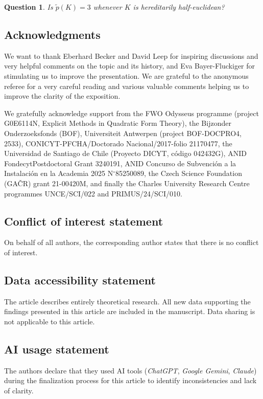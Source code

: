 \documentclass[12pt,leqno]{amsart}
\newcommand{\wt}[1]{\widetilde{{#1}}}
\numberwithin{equation}{section}
\newtheorem{qu}[equation]{Question}
\theoremstyle{definition}
\theoremstyle{plain}
\begin{document}
\begin{qu}\label{Q:final2}
Is $\wt{p}(K)=3$ whenever $K$ is hereditarily half-euclidean?
\end{qu}

\subsection*{Acknowledgments} 
We want to thank Eberhard Becker and David Leep for inspiring discussions and very helpful comments on the topic and its history, and Eva Bayer-Fluckiger for stimulating us to improve the presentation.
We are grateful to the anonymous referee for a very careful reading and various valuable comments helping us to improve the clarity of the exposition.

We gratefully acknowledge support from the {FWO Odysseus programme} (pro\-ject G0E6114N, {Explicit Methods in Quadratic Form Theory}), 
the Bijzonder Onderzoeksfonds (BOF), Universiteit Antwerpen
(project BOF-DOCPRO4, 2533), CONICYT-PFCHA/Doctorado Nacional/2017-folio 21170477, the Universidad de Santiago de Chile (Proyecto DICYT,
c\'odigo 042432G), ANID Fondecyt\linebreak Postdoctoral Grant 3240191, ANID Concurso de Subvenci\'on a la Instalaci\'on en la Academia 2025 N$^\circ$85250089, the {Czech Science Foundation} (GA\v CR) grant 21-00420M, and finally the {Charles University Research Centre programmes} \linebreak UNCE/SCI/022 and PRIMUS/24/SCI/010.

\subsection*{Conflict of interest statement}
On behalf of all authors, the corresponding author states that there is no conflict of interest.

\subsection*{Data accessibility statement}
The  article describes entirely theoretical research.
All new data supporting the findings presented in this article are included in the manuscript.
Data sharing is not applicable to this article.

\subsection*{AI usage statement}
The authors declare that they used AI tools (\emph{ChatGPT}, \emph{Google Gemini}, \emph{Claude}) during the finalization process for this article to identify inconsistencies and lack of clarity.
\end{document}
